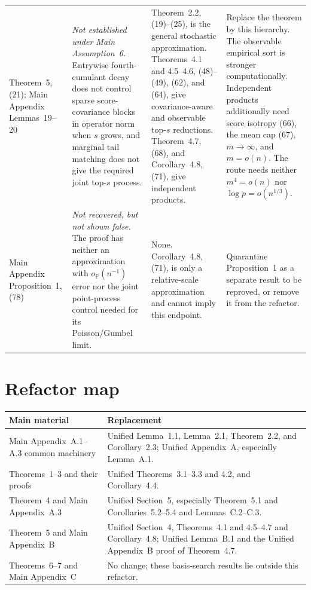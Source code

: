 \documentclass[a4paper,10pt,english]{article}
\theoremstyle{definition}
\newcommand{\Prob}{\mathbb P}
\begin{document}
\begin{longtable}{@{}>{\raggedright\arraybackslash}p{}
>{\raggedright\arraybackslash}p{}
>{\raggedright\arraybackslash}p{}
>{\raggedright\arraybackslash}p{}@{}}
Theorem~5, (21); Main Appendix Lemmas~19--20 &
\emph{Not established under Main Assumption~6.}  Entrywise fourth-
cumulant decay does not control sparse score-covariance blocks in
operator norm when $s$ grows, and marginal tail matching does not give
the required joint top-$s$ process. &
Theorem~2.2, (19)--(25), is the general stochastic approximation.
Theorems~4.1 and 4.5--4.6, (48)--(49), (62), and (64), give
covariance-aware and observable top-$s$ reductions.  Theorem~4.7, (68),
and Corollary~4.8,
(71), give independent products. &
Replace the theorem by this hierarchy.  The observable empirical sort
is stronger computationally.  Independent products additionally need
score isotropy (66), the mean cap (67), $m\to\infty$, and $m=o(n)$.
The route needs neither $m^4=o(n)$ nor $\log p=o(n^{1/3})$. \\
\addlinespace

Main Appendix Proposition~1, (78) &
\emph{Not recovered, but not shown false.}  The proof has neither an
approximation with $o_{\Prob}(n^{-1})$ error nor the joint point-process
control needed for its Poisson/Gumbel limit. &
None.  Corollary~4.8, (71), is only a relative-scale approximation and
cannot imply this endpoint. &
Quarantine Proposition~1 as a separate result to be reproved, or remove
it from the refactor. \\

\bottomrule
\end{longtable}
\endgroup

\section{Refactor map}

\begin{center}
\small
\begin{tabular}{@{}>{\raggedright\arraybackslash}p{}
>{\raggedright\arraybackslash}p{}@{}}
\toprule
Main material & Replacement \\
\midrule
Main Appendix~A.1--A.3 common machinery &
Unified Lemma~1.1, Lemma~2.1, Theorem~2.2, and Corollary~2.3;
Unified Appendix~A, especially Lemma~A.1. \\
\addlinespace
Theorems~1--3 and their proofs &
Unified Theorems~3.1--3.3 and 4.2, and Corollary~4.4. \\
\addlinespace
Theorem~4 and Main Appendix~A.3 &
Unified Section~5, especially Theorem~5.1 and
Corollaries~5.2--5.4 and Lemmas~C.2--C.3. \\
\addlinespace
Theorem~5 and Main Appendix~B &
Unified Section~4, Theorems~4.1 and 4.5--4.7 and Corollary~4.8;
Unified Lemma~B.1 and the Unified Appendix~B proof of Theorem~4.7. \\
\addlinespace
Theorems~6--7 and Main Appendix~C &
No change; these basis-search results lie outside this refactor. \\
\bottomrule
\end{tabular}
\end{center}
\end{document}
